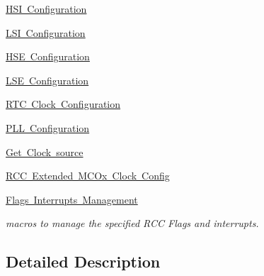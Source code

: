 \begin{DoxyCompactItemize}
\mbox{\hyperlink{group___r_c_c___h_s_i___configuration}{H\+S\+I Configuration}}
\item 
\mbox{\hyperlink{group___r_c_c___l_s_i___configuration}{L\+S\+I Configuration}}
\item 
\mbox{\hyperlink{group___r_c_c___h_s_e___configuration}{H\+S\+E Configuration}}
\item 
\mbox{\hyperlink{group___r_c_c___l_s_e___configuration}{L\+S\+E Configuration}}
\item 
\mbox{\hyperlink{group___r_c_c___internal___r_t_c___clock___configuration}{R\+T\+C Clock Configuration}}
\item 
\mbox{\hyperlink{group___r_c_c___p_l_l___configuration}{P\+L\+L Configuration}}
\item 
\mbox{\hyperlink{group___r_c_c___get___clock__source}{Get Clock source}}
\item 
\mbox{\hyperlink{group___r_c_c_ex___m_c_ox___clock___config}{R\+C\+C Extended M\+C\+Ox Clock Config}}
\item 
\mbox{\hyperlink{group___r_c_c___flags___interrupts___management}{Flags Interrupts Management}}
\begin{DoxyCompactList}\small\item\em macros to manage the specified R\+CC Flags and interrupts. \end{DoxyCompactList}\end{DoxyCompactItemize}


\subsection{Detailed Description}
